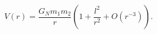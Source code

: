 \begin{equation}
V(r) = \frac{G_N m_1 m_2}{r}\left(1 + \frac{l^2}{r^2} + O(r^{-3})\right).
\end{equation}

